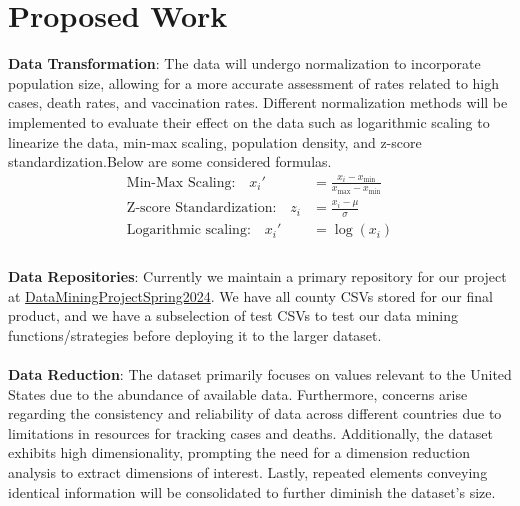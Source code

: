 \documentclass[sigconf,screen,nonacm]{acmart}
\begin{document}
\section{Proposed Work}

\textbf{Data Transformation}: The data will undergo normalization to incorporate population size, allowing for a more accurate assessment of rates related to high cases, death rates, and vaccination rates. Different normalization methods will be implemented to evaluate their effect on the data such as logarithmic scaling to linearize the data, min-max scaling, population density, and z-score standardization.Below are some considered formulas.
\begin{align*}
\text{Min-Max Scaling:} \quad x_i' &= \frac{{x_i - x_{\text{min}}}}{{x_{\text{max}} - x_{\text{min}}}} \\
\text{Z-score Standardization:} \quad z_i &= \frac{{x_i - \mu}}{{\sigma}} \\
\text{Logarithmic scaling:} \quad x_i' &= \log(x_i) \\
\end{align*}
\\
\textbf{Data Repositories}: Currently we maintain a primary repository for our project at \href{https://github.com/CCoakley6/DataMiningProjectSpring2024}{DataMiningProjectSpring2024}. We have all county CSVs stored for our final product, and we have a subselection of test CSVs to test our data mining functions/strategies before deploying it to the larger dataset.\\
\\
\textbf{Data Reduction}: The dataset primarily focuses on values relevant to the United States due to the abundance of available data. Furthermore, concerns arise regarding the consistency and reliability of data across different countries due to limitations in resources for tracking cases and deaths. Additionally, the dataset exhibits high dimensionality, prompting the need for a dimension reduction analysis to extract dimensions of interest. Lastly, repeated elements conveying identical information will be consolidated to further diminish the dataset's size.\\
\end{document}
